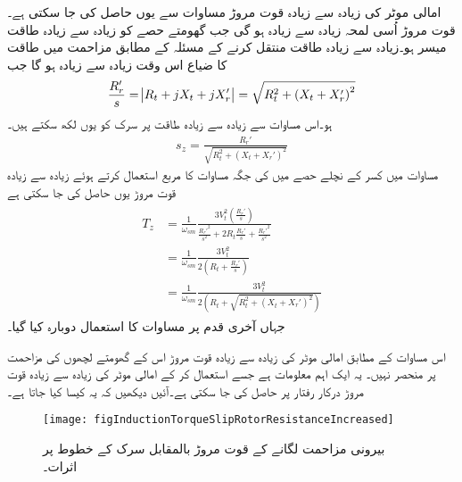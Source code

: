 امالی موٹر کی زیادہ سے زیادہ قوت مروڑ مساوات   سے یوں حاصل کی جا سکتی ہے۔قوت مروڑ اُسی لمحہ زیادہ سے زیادہ ہو گی جب گھومتے حصے کو زیادہ سے زیادہ طاقت میسر ہو۔زیادہ سے زیادہ طاقت منتقل کرنے کے مسئلہ کے مطابق مزاحمت  میں طاقت کا ضیاع اس وقت زیادہ سے زیادہ ہو گا جب
\begin{align}\label{مساوات_امالی_زیادہ_طاقت_منتقلی_شرط}
\frac{R_r'}{s}=\abs{R_t+j X_t+j X_r'}=\sqrt{R_t^2+\left(X_t+X_r'\right)^2}
\end{align}
ہو۔اس مساوات سے زیادہ سے زیادہ طاقت پر سرک  کو یوں لکھ سکتے ہیں۔
\begin{align}\label{مساوات_امالی_زیادہ_طاقت_پر_سرک}
s_z=\frac{R_r'}{\sqrt{R_t^2+\left(X_t+X_r'\right)^2}}
\end{align}
مساوات   میں کسر کے نچلے حصے میں  کی جگہ  مساوات   کا مربع استعمال کرتے ہوئے زیادہ سے زیادہ قوت مروڑ  یوں حاصل کی جا سکتی ہے
\begin{gather}
\begin{aligned}
T_z&=\frac{1}{\omega_{sm}} \frac{3 V_t^2 \left(\frac{R_r'}{s} \right)}{\frac{R_r'^2}{s^2}+2 R_t \frac{R_r'}{s}+\frac{R_r'^2}{s^2}}\\
&=\frac{1}{\omega_{sm}} \frac{3 V_t^2 }{2 \left(R_t+\frac{R_r'}{s} \right)}\\
&=\frac{1}{\omega_{sm}} \frac{3 V_t^2}{2 \left(R_t+\sqrt{R_t^2+\left(X_t+X_r' \right)^2} \right)}
\end{aligned}
\end{gather}
جہاں آخری قدم پر مساوات کا استعمال دوبارہ کیا گیا۔

اس مساوات کے مطابق امالی موٹر کی زیادہ سے زیادہ قوت مروڑ اس کے گھومتے لچھوں کی  مزاحمت پر منحصر نہیں۔ یہ ایک اہم معلومات ہے جسے استعمال کر کے امالی موٹر کی زیادہ سے زیادہ قوت مروڑ درکار رفتار پر  حاصل کی جا سکتی ہے۔آئیں دیکھیں کہ یہ کیسا کیا جاتا ہے۔
\begin{figure}
\centering
\texttt{[image: figInductionTorqueSlipRotorResistanceIncreased]}
\caption{بیرونی مزاحمت لگانے کے قوت مروڑ بالمقابل سرک کے خطوط پر اثرات۔}
\label{شکل_امالی_بیرونی_مزاحمت_اور_مروٹ}
\end{figure}

